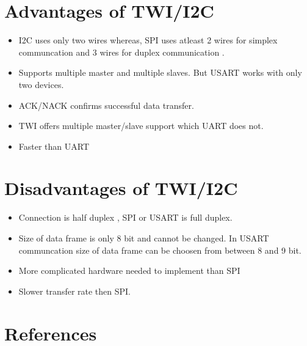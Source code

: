 \documentclass{article}
\begin{document}
\section{Advantages of TWI/I2C}

\begin{itemize}
	\item I2C uses only two wires whereas,
	 SPI uses atleast 2 wires for simplex communcation and 3 wires for duplex communication . 
	 \item Supports multiple master and multiple slaves. But USART works with only two devices.
	 \item ACK/NACK confirms successful data transfer.
	 \item TWI offers multiple master/slave support which UART does not.
	 \item Faster than UART
\end{itemize}

\section{Disadvantages of TWI/I2C}

\begin{itemize}
	\item Connection is half duplex , SPI or USART is full duplex.
	\item Size of data frame is only 8 bit and cannot be changed.
	 In USART communcation size of data frame can be choosen from between 8 and 9 bit.
	\item More complicated hardware needed to implement than SPI
	\item Slower transfer rate then SPI.
\end{itemize}

\section{References}
\end{document}
